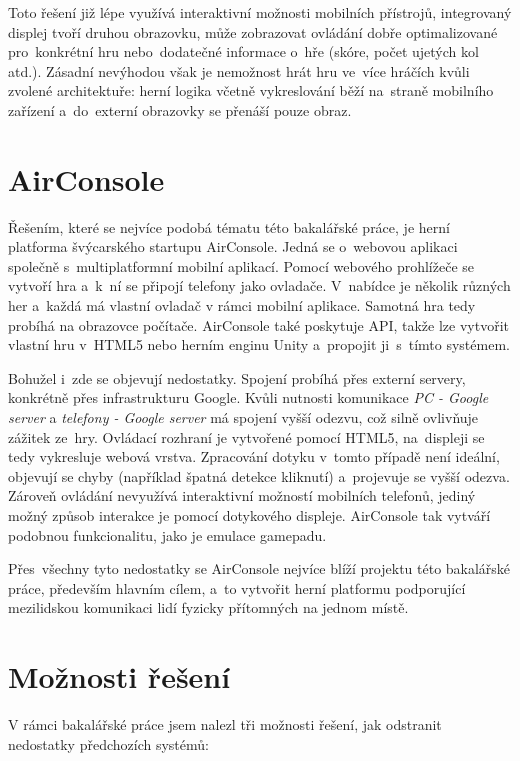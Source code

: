 \documentclass[thesis=B,czech,hidelinks]{FITthesis}[2012/06/26] %
\begin{document}
Toto řešení již lépe využívá interaktivní možnosti mobilních přístrojů, integrovaný displej tvoří druhou obrazovku, může zobrazovat ovládání dobře optimalizované pro~konkrétní hru nebo~dodatečné informace o~hře (skóre, počet ujetých kol atd.). Zásadní nevýhodou však je nemožnost hrát hru ve~více hráčích kvůli zvolené architektuře: herní logika včetně vykreslování běží na~straně mobilního zařízení a~do~externí obrazovky se přenáší pouze obraz.

\section{AirConsole}

Řešením, které se nejvíce podobá tématu této bakalářské práce, je herní platforma švýcarského startupu AirConsole\cite{airconsole}. Jedná se o~webovou aplikaci společně s~multiplatformní mobilní aplikací. Pomocí webového prohlížeče se vytvoří hra a~k~ní se připojí telefony jako ovladače. V~nabídce je několik různých her a~každá má vlastní ovladač v rámci mobilní aplikace. Samotná hra tedy probíhá na obrazovce počítače. AirConsole také poskytuje API, takže lze vytvořit vlastní hru v~HTML5 nebo herním enginu Unity a~propojit ji~s~tímto systémem.

Bohužel i~zde se objevují nedostatky. Spojení probíhá přes externí servery, konkrétně přes infrastrukturu Google\cite{airconsole}. Kvůli nutnosti komunikace \textit{PC - Google server} a \textit{telefony - Google server} má spojení vyšší odezvu, což silně ovlivňuje zážitek ze~hry. Ovládací rozhraní je vytvořené pomocí HTML5, na~displeji se tedy vykresluje webová vrstva. Zpracování dotyku v~tomto případě není ideální, objevují se chyby (například špatná detekce kliknutí) a~projevuje se vyšší odezva. Zároveň ovládání nevyužívá interaktivní možností mobilních telefonů, jediný možný způsob interakce je pomocí dotykového displeje. AirConsole tak vytváří podobnou funkcionalitu, jako je emulace gamepadu.

Přes~všechny tyto nedostatky se AirConsole nejvíce blíží projektu této bakalářské práce, především hlavním cílem, a~to vytvořit herní platformu podporující mezilidskou komunikaci lidí fyzicky přítomných na jednom místě.

\section{Možnosti řešení}

V rámci bakalářské práce jsem nalezl tři možnosti řešení, jak odstranit nedostatky předchozích systémů:
\end{document}
